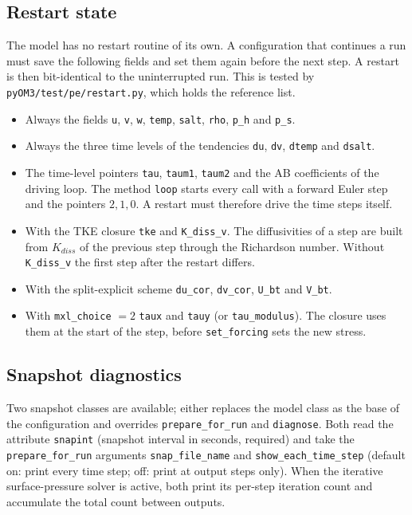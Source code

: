\documentclass[12pt]{article}
\begin{document}
\subsection*{Restart state}

The model has no restart routine of its own. A configuration that continues a
run must save the following fields and set them again before the next step.
A restart is then bit-identical to the uninterrupted run.
This is tested by \verb|pyOM3/test/pe/restart.py|, which holds the reference list.
\begin{itemize}
\item Always the fields \verb|u|, \verb|v|, \verb|w|, \verb|temp|, \verb|salt|, \verb|rho|, \verb|p_h| and \verb|p_s|.
\item Always the three time levels of the tendencies \verb|du|, \verb|dv|, \verb|dtemp| and \verb|dsalt|.
\item The time-level pointers \verb|tau|, \verb|taum1|, \verb|taum2| and the AB coefficients of the driving loop.
The method \verb|loop| starts every call with a forward Euler step and the pointers $2,1,0$.
A restart must therefore drive the time steps itself.
\item With the TKE closure \verb|tke| and \verb|K_diss_v|.
The diffusivities of a step are built from $K_{diss}$ of the previous step through the Richardson number.
Without \verb|K_diss_v| the first step after the restart differs.
\item With the split-explicit scheme \verb|du_cor|, \verb|dv_cor|, \verb|U_bt| and \verb|V_bt|.
\item With \verb|mxl_choice| $=2$ \verb|taux| and \verb|tauy| (or \verb|tau_modulus|).
The closure uses them at the start of the step, before \verb|set_forcing| sets the new stress.
\end{itemize}

\subsection*{Snapshot diagnostics}

Two snapshot classes are available; either replaces the model class as the
base of the configuration and overrides \verb|prepare_for_run| and
\verb|diagnose|. Both read the attribute \verb|snapint| (snapshot interval in
seconds, required) and take the \verb|prepare_for_run| arguments
\verb|snap_file_name| and \verb|show_each_time_step| (default on: print every
time step; off: print at output steps only). When the iterative
surface-pressure solver is active, both print its per-step iteration count
and accumulate the total count between outputs.
\end{document}
